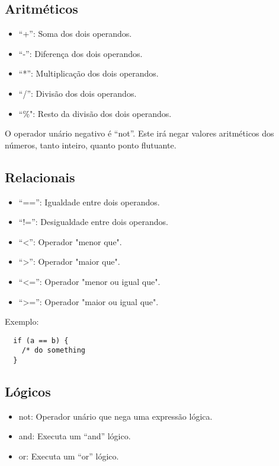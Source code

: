 \documentclass[a4paper, 12pt, article]{memoir}
\begin{document}
\subsection{Aritméticos}
\label{subsec:aritmeticos}
\begin{itemize}
\item ``+'': Soma dos dois operandos.
\item ``-'': Diferença dos dois operandos.
\item ``*'': Multiplicação dos dois operandos.
\item ``/'': Divisão dos dois operandos.
\item ``\%": Resto da divisão dos dois operandos.
\end{itemize}

O operador unário negativo é ``not''. Este irá negar valores aritméticos dos
números, tanto inteiro, quanto ponto flutuante.

\subsection{Relacionais}
\label{subsec:relacionais}
\begin{itemize}
\item ``=='': Igualdade entre dois operandos.
\item ``!='': Desigualdade entre dois operandos.
\item ``\textless'': Operador "menor que".
\item ``\textgreater'': Operador "maior que".
\item ``\textless='': Operador "menor ou igual que".
\item ``\textgreater='': Operador "maior ou igual que".
\end{itemize}

Exemplo:
\begin{lstlisting}
  if (a == b) {
    /* do something
  }
\end{lstlisting}

\subsection{Lógicos}
\label{subsec:logicos}
\begin{itemize}
\item not: Operador unário que nega uma expressão lógica.
\item and: Executa um ``and'' lógico.
\item or: Executa um ``or'' lógico.
\end{itemize}
\end{document}
